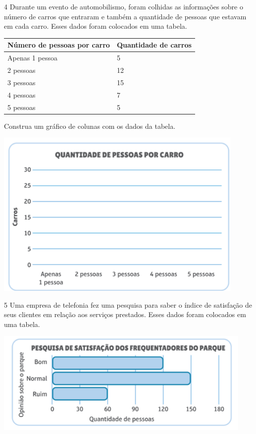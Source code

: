 \num{4} Durante um evento de automobilismo, foram colhidas as informações sobre o número de carros
que entraram e também a quantidade de pessoas que estavam em cada carro.
Esses dados foram colocados em uma tabela.

\begin{longtable}[]{@{}ll@{}}
\toprule
Número de pessoas por carro & Quantidade de carros\tabularnewline
\midrule
\endhead
Apenas 1 pessoa & 5\tabularnewline
2 pessoas & 12\tabularnewline
3 pessoas & 15\tabularnewline
4 pessoas & 7\tabularnewline
5 pessoas & 5\tabularnewline
\bottomrule
\end{longtable}

Construa um gráfico de colunas com os dados da tabela.


\includegraphics[width=4.76708in,height=3.21695in]{./media/image95.png}


\num{5} Uma empresa de telefonia fez uma pesquisa para saber o índice de
satisfação de seus clientes em relação aos serviços prestados. Esses dados foram
colocados em uma tabela.


\includegraphics[width=4.92543in,height=1.97517in]{./media/image96.png}

